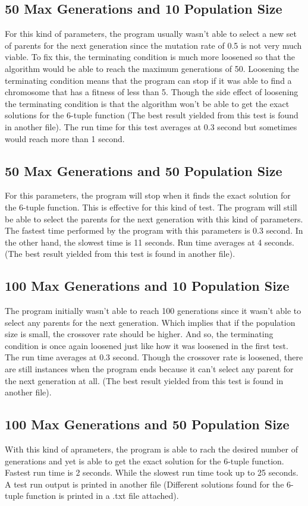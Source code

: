 \documentclass{acm_proc_article-sp}
\begin{document}
\subsection{50 Max Generations and 10 Population Size}
For this kind of parameters, the program usually wasn't able to select a new set of parents for the next generation since the mutation rate of 0.5 is not very much viable. To fix this, the terminating condition is much more loosened so that the algorithm would be able to reach the maximum generations of 50. Loosening the terminating condition means that the program can stop if it was able to find a chromosome that has a fitness of less than 5. Though the side effect of loosening the terminating condition is that the algorithm won't be able to get the exact solutions for the 6-tuple function (The best result yielded from this test is found in another file). The run time for this test averages at 0.3 second but sometimes would reach more than 1 second.
\subsection{50 Max Generations and 50 Population Size}
For this parameters, the program will stop when it finds the exact solution for the 6-tuple function. This is effective for this kind of test. The program will still be able to select the parents for the next generation with this kind of parameters. The fastest time performed by the program with this parameters is 0.3 second. In the other hand, the slowest time is 11 seconds. Run time averages at 4 seconds. (The best result yielded from this test is found in another file).

\subsection{100 Max Generations and 10 Population Size}
The program initially wasn't able to reach 100 generations since it wasn't able to select any parents for the next generation. Which implies that if the population size is small, the crossover rate should be higher. And so, the terminating condition is once again loosened just like how it was loosened in the first test. The run time averages at 0.3 second. Though the crossover rate is loosened, there are still instances when the program ends because it can't select any parent for the next generation at all. (The best result yielded from this test is found in another file).

\subsection{100 Max Generations and 50 Population Size}
With this kind of aprameters, the program is able to rach the desired number of generations and yet is able to get the exact solution for the 6-tuple function. Fastest run time is 2 seconds. While the slowest run time took up to 25 seconds. A test run output is printed in another file (Different solutions found for the 6-tuple function is printed in a .txt file attached).
\end{document}
